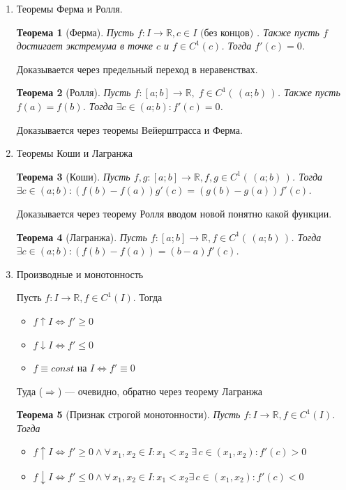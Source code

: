 \documentclass[a4paper,12pt]{article}
\newcommand\R{\mathbb{R}}
\theoremstyle{plain}
\newtheorem{thrm}{Теорема}
\theoremstyle{definition}
\theoremstyle{remark}
\def\resetdefs{ \setcounter{defn}{0}\setcounter{exmp}{0} }
\def\resetthrm{ \setcounter{thrm}{0}\setcounter{stat}{0} }
\def\resetrem{ \setcounter{rem}{0} }
\def\resetall{ \resetdefs \resetthrm \resetrem}
\def\itemrange#1{%
  \addtocounter{enumi}{1}%
  \edef\labelenumi{\theenumi--\noexpand\theenumi.}%
  \addtocounter{enumi}{-1}%
  \addtocounter{enumi}{#1}%
  \item
  \def\labelenumi{\theenumi.}
}
\begin{document}
\begin{enumerate}
  \item Теоремы Ферма и Ролля.
    \resetall
    \begin{thrm}[Ферма]
      Пусть $f : I \to \R, c \in I \text{ (без концов) }$. Также пусть $f$  достигает 
      экстремума в точке $c$ и $f \in C^1(c)$. Тогда $f'(c) = 0$.
    \end{thrm} Доказывается через предельный переход в неравенствах.
    \begin{thrm}[Ролля]
      Пусть $f : [a;b] \to \R,\; f\in C^1(\,(a;b)\,)$. Также пусть $f(a)=f(b)$.
      Тогда $\exists c\in (a;b) : f'(c) = 0$.
    \end{thrm} Доказывается через теоремы Вейерштрасса и Ферма.
  \item Теоремы Коши и Лагранжа
    \begin{thrm}[Коши]
      Пусть $f,g : [a;b] \to \R, f,g \in C^1(\,(a;b)\,)$.  
      Тогда $\exists c\in (a;b) : (f(b)-f(a))g'(c) = (g(b)-g(a))f'(c) $.
    \end{thrm} Доказывается через теорему Ролля вводом новой понятно какой функции.
    \begin{thrm}[Лагранжа]
      Пусть $f : [a;b] \to \R, f \in C^1(\,(a;b)\,)$.  
      Тогда $\exists c\in (a;b) : ( f(b)-f(a) ) = (b-a)f'(c) $.
    \end{thrm}
  \itemrange{2} Производные и монотонность
    \resetall
    { \thrm Пусть $f : I \to \R , f \in C^1(I)$. Тогда 
      \begin{itemize}
        \item $f \uparrow I \Leftrightarrow f' \geq 0$
        \item $f \downarrow I \Leftrightarrow f' \leq 0$
        \item $f\equiv const \text{ на } I \Leftrightarrow f' \equiv 0$
      \end{itemize}
    } Туда ($\Rightarrow$) --- очевидно, обратно через теорему Лагранжа
    
    \begin{thrm}[Признак строгой монотонности]
      Пусть $f : I \to \R , f \in C^1(I)$. Тогда 
      \begin{itemize}
        \item $f \uparrow I \Leftrightarrow f' \geq 0 
          \land \forall\, x_1,x_2 \in I : x_1 < x_2 \;\exists\, c \in (x_1, x_2) : f'(c) > 0$
        \item $f \downarrow I \Leftrightarrow f' \leq 0
          \land \forall\, x_1,x_2 \in I : x_1 < x_2 \exists\, c \in (x_1, x_2) : f'(c) < 0$
      \end{itemize}
    \end{thrm}
    

\end{enumerate}
\end{document}
